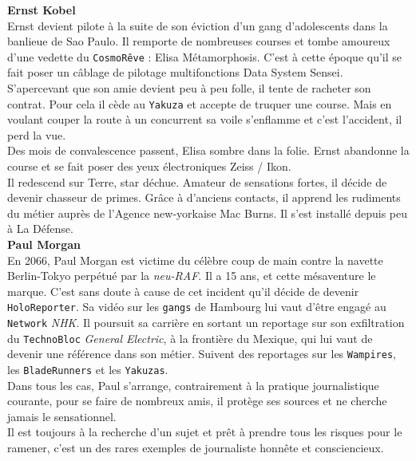 \documentclass[11pt,twoside,a4paper]{article}
\begin{document}
\begin{multicols}{2}
	\footnotesize
	
	\textbf{Ernst Kobel}~\\
	Ernst devient pilote {\`a} la suite de son {\'e}viction d'un gang d'adolescents dans la banlieue de Sao Paulo. Il remporte de nombreuses courses et tombe amoureux d'une vedette du \texttt{CosmoR{\^e}ve} : Elisa M{\'e}tamorphosis. C'est {\`a} cette {\'e}poque qu'il se fait poser un c{\^a}blage de pilotage multifonctions Data System Sensei. ~\\
	S'apercevant que son amie devient peu {\`a} peu folle, il tente de racheter son contrat. Pour cela il c{\`e}de au \texttt{Yakuza} et accepte de truquer une course. Mais en voulant couper la route {\`a} un concurrent sa voile s'enflamme et c'est l'accident, il perd la vue. ~\\
	Des mois de convalescence passent, Elisa sombre dans la folie. Ernst abandonne la course et se fait poser des yeux {\'e}lectroniques Zeiss / Ikon. ~\\
	Il redescend sur Terre, star d{\'e}chue. Amateur de sensations fortes, il d{\'e}cide de devenir chasseur de primes. Gr{\^a}ce {\`a} d'anciens contacts, il apprend les rudiments du m{\'e}tier aupr{\`e}s de l'Agence new-yorkaise Mac Burns. Il s'est install{\'e} depuis peu {\`a} La D{\'e}fense. ~\\
	
	\textbf{Paul Morgan}~\\
	En 2066, Paul Morgan est victime du c{\'e}l{\`e}bre coup de main contre la navette Berlin-Tokyo perp{\'e}tu{\'e} par la \emph{neu-RAF}. Il a 15 ans, et cette m{\'e}saventure le marque. C'est sans doute {\`a} cause de cet incident qu'il d{\'e}cide de devenir \texttt{HoloReporter}. Sa vid{\'e}o sur les \texttt{gangs} de Hambourg lui vaut d'{\^e}tre engag{\'e} au \texttt{Network} \emph{NHK}. Il poursuit sa carri{\`e}re en sortant un reportage sur son exfiltration du \texttt{TechnoBloc} \emph{General Electric}, {\`a} la fronti{\`e}re du Mexique, qui lui vaut de devenir une r{\'e}f{\'e}rence dans son m{\'e}tier. Suivent des reportages sur les \texttt{Wampires}, les \texttt{BladeRunners} et les \texttt{Yakuzas}. ~\\
	Dans tous les cas, Paul s'arrange, contrairement {\`a} la pratique journalistique courante, pour se faire de nombreux amis, il prot{\`e}ge ses sources et ne cherche jamais le sensationnel. ~\\
	Il est toujours {\`a} la recherche d'un sujet et pr{\^e}t {\`a} prendre tous les risques pour le ramener, c'est un des rares exemples de journaliste honn{\^e}te et consciencieux. ~\\
	

\end{multicols}
\end{document}
